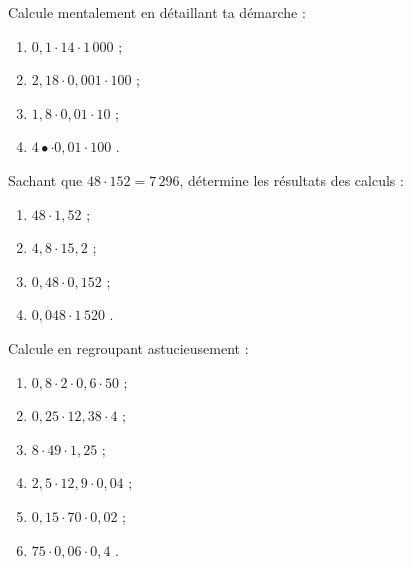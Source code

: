 \begin{exercice}
Calcule mentalement en détaillant ta démarche :
\begin{enumerate} 
 \item $0,1 \cdot 14 \cdot 1\,000$ \dotfill ; 
 
 \item $2,18 \cdot 0,001 \cdot 100$ \dotfill ; 

 \item $1,8 \cdot 0,01 \cdot 10$ \dotfill ; 

 \item $4 •\cdot 0,01 \cdot 100$ \dotfill. 

 \end{enumerate} 
\end{exercice}


\begin{exercice}
Sachant que $48 \cdot 152 = 7\,296$, détermine les résultats des calculs :
\begin{enumerate} 
 \item $48 \cdot 1,52$ \dotfill ; 
 
 \item $4,8 \cdot 15,2$ \dotfill ; 
 
 \item $0,48 \cdot 0,152$ \dotfill ; 
 
 \item $0,048 \cdot 1\,520$ \dotfill. 

 \end{enumerate} 
\end{exercice}


\begin{exercice}
Calcule en regroupant astucieusement :
\begin{enumerate} 
 \item $0,8 \cdot 2 \cdot 0,6 \cdot 50$ \dotfill ; 
 
 \item $0,25 \cdot 12,38 \cdot 4$ \dotfill ; 
 
 \item $8 \cdot 49 \cdot 1,25$ \dotfill ; 
 
 \item $2,5 \cdot 12,9 \cdot 0,04$ \dotfill ; 
 
 \item $0,15 \cdot 70 \cdot 0,02$ \dotfill ; 
 
 \item $75 \cdot 0,06 \cdot 0,4$ \dotfill. 
 
 \end{enumerate} 
\end{exercice}


